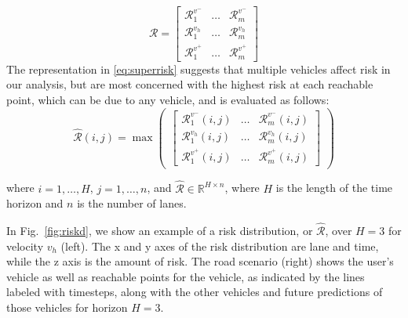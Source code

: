 \documentclass[letterpaper, 10 pt, conference]{ieeeconf}  %
\newcommand\NB[1]{$\spadesuit$\footnote{NB: #1}}
\begin{document}
\begin{equation} \label{eq:superrisk}
\mathcal{R} =
\begin{bmatrix}
\mathcal{R}_{1}^{v^-} & \ldots & \mathcal{R}_{m}^{v^-} \\
\mathcal{R}_{1}^{v_h} & \ldots & \mathcal{R}_{m}^{v_h} \\
\mathcal{R}_{1}^{v^+} & \ldots   & \mathcal{R}_{m}^{v^+}
\end{bmatrix}
\end{equation}
The representation in \eqref{eq:superrisk} suggests that multiple vehicles affect risk in our analysis, but are most concerned with the highest risk at each reachable point, which can be due to any vehicle, and is evaluated as follows: %
\begin{equation} \label{eq:riskdistribution}
 \hat{\mathcal{R}}(i,j) = \max\begin{pmatrix}
 \begin{bmatrix}
\mathcal{R}_{1}^{v^-}(i,j) & \ldots & \mathcal{R}_{m}^{v^-}(i,j) \\
\mathcal{R}_{1}^{v_h}(i,j) & \ldots & \mathcal{R}_{m}^{v_h}(i,j) \\
\mathcal{R}_{1}^{v^+}(i,j) & \ldots   & \mathcal{R}_{m}^{v^+}(i,j)
\end{bmatrix}\end{pmatrix}
\end{equation}

 where $i = 1,\ldots,H$, $j = 1,\ldots,n$, and $\hat{\mathcal{R}} \in \mathbb{R}^{H\times n}$, where $H$ is the length of the time horizon and $n$ is the number of lanes. 
 
 In Fig.~\ref{fig:riskd}, we show an example of a risk distribution, or $\hat{\mathcal{R}}$, over $H=3$ for velocity $v_h$ (left). The x and y axes of the risk distribution are lane and time, while the z axis is the amount of risk. The road scenario (right) shows the user's vehicle as well as reachable points for the vehicle, as indicated by the lines labeled with timesteps, along with the other vehicles and future predictions of those vehicles for horizon $H=3$.
\end{document}
